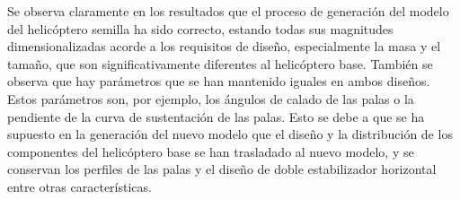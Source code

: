 Se observa claramente en los resultados que el proceso de generación del modelo del helicóptero semilla ha sido correcto, estando todas sus magnitudes dimensionalizadas acorde a los requisitos de diseño, especialmente la masa y el tamaño, que son significativamente diferentes al helicóptero base.
También se observa que hay parámetros que se han mantenido iguales en ambos diseños. Estos parámetros son, por ejemplo, los ángulos de calado de las palas o la pendiente de la curva de sustentación de las palas. Esto se debe a que se ha supuesto en la generación del nuevo modelo que el diseño y la distribución de los componentes del helicóptero base se han trasladado al nuevo modelo, y se conservan los perfiles de las palas y el diseño de doble estabilizador horizontal entre otras características.

\singlespacing